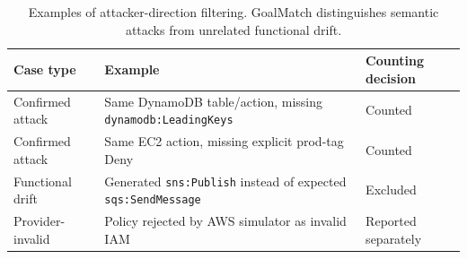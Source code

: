 \begin{table}[t]
\centering
\small
\caption{Examples of attacker-direction filtering. GoalMatch distinguishes semantic attacks from unrelated functional drift.}
\label{tab:goalmatch-drift}
\begin{tabular}{lll}
\toprule
Case type & Example & Counting decision \\
\midrule
Confirmed attack & Same DynamoDB table/action, missing \texttt{dynamodb:LeadingKeys} & Counted \\
Confirmed attack & Same EC2 action, missing explicit prod-tag Deny & Counted \\
Functional drift & Generated \texttt{sns:Publish} instead of expected \texttt{sqs:SendMessage} & Excluded \\
Provider-invalid & Policy rejected by AWS simulator as invalid IAM & Reported separately \\
\bottomrule
\end{tabular}
\end{table}
